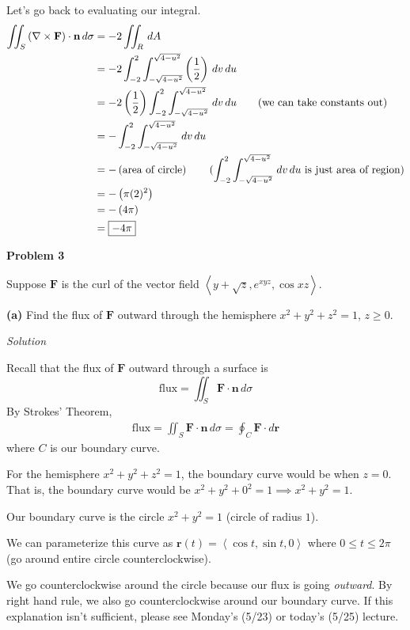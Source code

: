 \documentclass{article}
\newcommand{\lrp}[1]{\left( #1 \right)}
\newcommand{\lra}[1]{\left\langle #1 \right\rangle}
\renewcommand{\r}[0]{\mathbf{r}}
\newcommand{\F}[0]{\mathbf{F}}
\newcommand{\n}[0]{\mathbf{n}}
\newcommand{\Solution}{\textit{Solution}}
\begin{document}
Let's go back to evaluating our integral.
\begin{align*}
    \iint_S \lrp{\nabla \times \F}\cdot \n\,d\sigma &= -2\iint_R \,dA\\
    &=-2\int_{-2}^2\int_{-\sqrt{4-u^2}}^{\sqrt{4-u^2}}\lrp{\frac{1}{2}}\,dv\,du\\
    &=-2\lrp{\frac{1}{2}}\int_{-2}^2\int_{-\sqrt{4-u^2}}^{\sqrt{4-u^2}}\,dv\,du\tag{we can take constants out}\\
    &=-\int_{-2}^2\int_{-\sqrt{4-u^2}}^{\sqrt{4-u^2}}\,dv\,du\\
    &=-\lrp{\text{area of circle}}\tag{$\displaystyle \int_{-2}^2\int_{-\sqrt{4-u^2}}^{\sqrt{4-u^2}}\,dv\,du$ is just area of region}\\
    &=-\lrp{\pi(2)^2}\\
    &=-\lrp{4\pi}\\
    &=\boxed{-4\pi}
\end{align*}



{}\textbf{Problem 3}

Suppose $\F$ is the curl of the vector field $\displaystyle\lra{y+\sqrt{z},e^{xyz},\cos xz}$.

{}\textbf{(a)} Find the flux of $\F$ outward through the hemisphere $x^2+y^2+z^2=1$, $z\geq 0$.

\Solution

Recall that the flux of $\F$ outward through a surface is
\begin{equation*}
    \text{flux}=\iint_S \F\cdot \n \,d\sigma
\end{equation*}
By Strokes' Theorem,
\begin{align*}
     \text{flux}=\iint_S \F\cdot \n \,d\sigma=\oint_C \F\cdot d\r
\end{align*}
where $C$ is our boundary curve.

For the hemisphere $x^2+y^2+z^2=1$, the boundary curve would be when $z=0$. That is, the boundary curve would be $x^2+y^2+0^2=1\implies x^2+y^2=1$. 

Our boundary curve is the circle $x^2+y^2=1$ (circle of radius $1$).

We can parameterize this curve as $\r(t)=\lra{\cos t,\sin t, 0}$ where $0\leq t\leq 2\pi$ (go around entire circle counterclockwise).

We go counterclockwise around the circle because our flux is going \textit{outward}. By right hand rule, we also go counterclockwise around our boundary curve. If this explanation isn't sufficient, please see Monday's (5/23) or today's (5/25) lecture.
\end{document}
